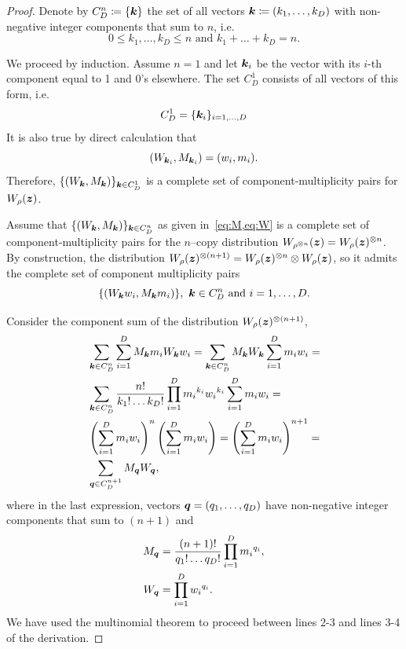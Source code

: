 \documentclass[pra,
aps,
twocolumn,
superscriptaddress,
groupedaddress,
nofootinbib,
reprint
]{revtex4-1}
\begin{document}
\begin{proof}
	Denote by $C_D^n \coloneqq \{\bm{k}\}$ the set of all vectors $\bm{k} \coloneqq (k_1, \dots, k_D)$ with non-negative integer components that sum to $n$, i.e.
	\begin{equation*}
	0 \leq k_1, \dots, k_D \leq n \text{ and } k_1 + \dots + k_D = n.
	\end{equation*}
	
	We proceed by induction.	
	Assume $n = 1$ and let $\bm{k}_i$ be the vector with its $i$-th component equal to 1 and 0's elsewhere.
	The set $C_D^1$ consists of all vectors of this form, i.e. 
\begin{equation*}
	C_D^1 = \{ \bm{k}_i \}_{i=1,\dots,D}
\end{equation*}
	It is also true by direct calculation that
\begin{equation*}
	\left( W_{\bm{k}_i}, M_{\bm{k}_i} \right) = (w_i, m_i).
\end{equation*}
Therefore, $\{ (W_{\bm{k}}, M_{\bm{k}}) \}_{\bm{k} \in C_D^1}$ is a complete set of component-multiplicity pairs for $W_\rho(\bm{z})$.

	Assume that $\{(W_{\bm{k}}, M_{\bm{k}})\}_{\bm{k} \in C_D^n}$ as given in~\cref{eq:M,eq:W} is a complete set of component-multiplicity pairs for the $n$--copy distribution $W_{\rho^{\otimes n}}(\bm{z}) = W_{\rho}(\bm{z})^{\otimes n}$.
	By construction, the distribution $W_{\rho}(\bm{z})^{\otimes (n+1)} = W_{\rho}(\bm{z})^{\otimes n} \otimes W_{\rho}(\bm{z})$, so it admits the complete set of component multiplicity pairs
\begin{equation}
	\{(W_{\bm{k}} w_i, M_{\bm{k}} m_i)\},\ \bm{k} \in C_D^n \text{ and } i=1,\dots,D.
\end{equation}
	
	Consider the component sum of the distribution $W_{\rho}(\bm{z})^{\otimes (n+1)}$,
\begin{align*}
	&\sum_{\bm{k} \in C_D^n}\sum_{i=1}^D M_{\bm{k}} m_i W_{\bm{k}} w_i = \sum_{\bm{k} \in C_D^n} M_{\bm{k}}W_{\bm{k}} \sum_{i=1}^D m_i w_i =\\
	&\sum_{\bm{k} \in C_D^n} \frac{n!}{k_1!\dots k_D!} \prod\limits_{i=1}^D {m_i}^{k_i}{w_i}^{k_i} \sum_{i=1}^D m_i w_i =\\
	&\left( \sum_{i=1}^D m_i w_i \right)^n \left( \sum_{i=1}^D m_i w_i \right) = \left( \sum_{i=1}^D m_i w_i \right)^{n+1} =\\
	&\sum_{\bm{q} \in C_D^{n+1}} M_{\bm{q}}W_{\bm{q}},
\end{align*}
where in the last expression, vectors $\bm{q} = (q_1, \dots, q_D)$ have non-negative integer components that sum to $(n+1)$ and 
\begin{align*}
	M_{\bm{q}} &= \frac{(n+1)!}{q_1!\dots q_D!} \prod\limits_{i=1}^D {m_i}^{q_i},\\
	W_{\bm{q}} &= \prod\limits_{i=1}^D {w_i}^{q_i}.
\end{align*}
We have used the multinomial theorem to proceed between lines 2-3 and lines 3-4 of the derivation.


\end{proof}
\end{document}
